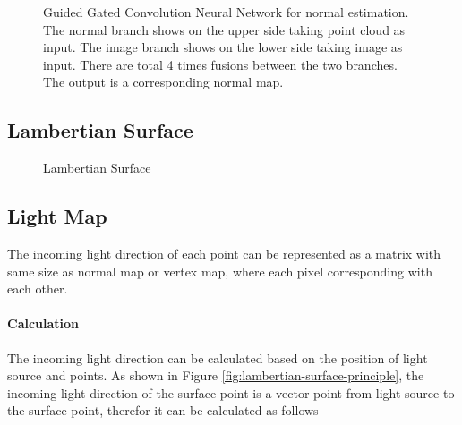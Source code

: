 \begin{figure}[th]
\begin{tikzpicture}
	\end{tikzpicture}
	
	\caption{Guided Gated Convolution Neural Network for normal estimation. The normal branch shows on the upper side taking point cloud as input. The image branch shows on the lower side taking image as input. There are total 4 times fusions between the two branches. The output is a corresponding normal map.}
	\label{fig:ng-archi}
\end{figure}


\subsection{Lambertian Surface}
\begin{figure}[h!]
	\centering
	\caption{Lambertian Surface}
	\label{fig:lambertian-surface}
\end{figure}

\subsection{Light Map}
The incoming light direction of each point can be represented as a matrix with same size as normal map or vertex map, where each pixel corresponding with each other.

\paragraph{Calculation}
The incoming light direction can be calculated based on the position of light source and points. As shown in Figure \ref{fig:lambertian-surface-principle}, the incoming light direction of the surface point is a vector point from light source to the surface point, therefor it can be calculated as follows

